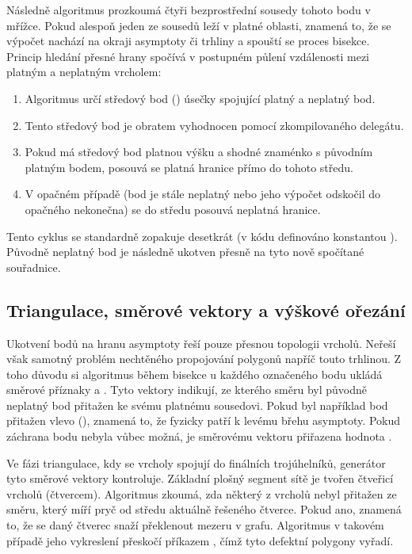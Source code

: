 \documentclass[czech, kiv, sem, he, iso690alph, pdf,viewonly]{fasthesis}
\begin{document}
Následně algoritmus prozkoumá čtyři bezprostřední sousedy tohoto bodu v mřížce. Pokud alespoň jeden ze sousedů leží v platné oblasti, znamená to, že se výpočet nachází na okraji asymptoty či trhliny a spouští se proces bisekce. Princip hledání přesné hrany spočívá v postupném půlení vzdálenosti mezi platným a neplatným vrcholem:

\begin{enumerate}
    \item Algoritmus určí středový bod () úsečky spojující platný a neplatný bod.
    \item Tento středový bod je obratem vyhodnocen pomocí zkompilovaného delegátu.
    \item Pokud má středový bod platnou výšku a shodné znaménko s původním platným bodem, posouvá se platná hranice přímo do tohoto středu.
    \item V opačném případě (bod je stále neplatný nebo jeho výpočet odskočil do opačného nekonečna) se do středu posouvá neplatná hranice.
\end{enumerate}

Tento cyklus se standardně zopakuje desetkrát (v kódu definováno konstantou ). 
Původně neplatný bod je následně ukotven přesně na tyto nově spočítané souřadnice.

\subsection{Triangulace, směrové vektory a výškové ořezání}
Ukotvení bodů na hranu asymptoty řeší pouze přesnou topologii vrcholů. Neřeší však samotný problém nechtěného propojování polygonů napříč touto trhlinou. 
Z toho důvodu si algoritmus během bisekce u každého označeného bodu ukládá směrové příznaky  a . 
Tyto vektory indikují, ze kterého směru byl původně neplatný bod přitažen ke svému platnému sousedovi. Pokud byl například bod přitažen vlevo (), 
znamená to, že fyzicky patří k levému břehu asymptoty. Pokud záchrana bodu nebyla vůbec možná, je směrovému vektoru přiřazena hodnota .

Ve fázi triangulace, kdy se vrcholy spojují do finálních trojúhelníků, generátor tyto směrové vektory kontroluje. Základní plošný segment sítě je tvořen čtveřicí vrcholů (čtvercem). Algoritmus zkoumá, zda některý z vrcholů nebyl přitažen ze směru, který míří pryč od středu aktuálně řešeného čtverce. Pokud ano, znamená to, že se daný čtverec snaží překlenout mezeru v grafu. Algoritmus v takovém případě jeho vykreslení přeskočí příkazem , čímž tyto defektní polygony vyřadí.
\end{document}
